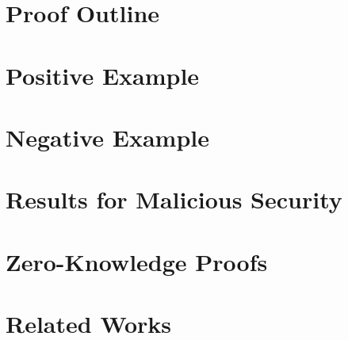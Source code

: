 \documentclass[11pt]{article}
\theoremstyle{theorem}
\theoremstyle{theorem}
\theoremstyle{remark}
\theoremstyle{note}
\theoremstyle{plain}
\theoremstyle{definition}
\begin{document}
\section{Proof Outline}

\section{Positive Example}

\section{Negative Example}

\section{Results for Malicious Security}

\section{Zero-Knowledge Proofs}

\section{Related Works}
\cite{C:IKPSY16}




\end{document}
